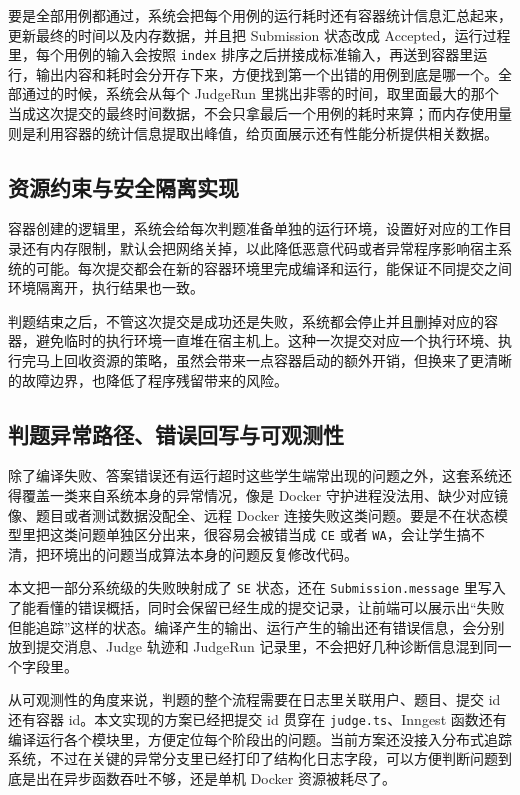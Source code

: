 要是全部用例都通过，系统会把每个用例的运行耗时还有容器统计信息汇总起来，更新最终的时间以及内存数据，并且把 Submission 状态改成 Accepted，运行过程里，每个用例的输入会按照 \texttt{index} 排序之后拼接成标准输入，再送到容器里运行，输出内容和耗时会分开存下来，方便找到第一个出错的用例到底是哪一个。全部通过的时候，系统会从每个 JudgeRun 里挑出非零的时间，取里面最大的那个当成这次提交的最终时间数据，不会只拿最后一个用例的耗时来算；而内存使用量则是利用容器的统计信息提取出峰值，给页面展示还有性能分析提供相关数据。

\subsection{资源约束与安全隔离实现}

容器创建的逻辑里，系统会给每次判题准备单独的运行环境，设置好对应的工作目录还有内存限制，默认会把网络关掉，以此降低恶意代码或者异常程序影响宿主系统的可能。每次提交都会在新的容器环境里完成编译和运行，能保证不同提交之间环境隔离开，执行结果也一致。

判题结束之后，不管这次提交是成功还是失败，系统都会停止并且删掉对应的容器，避免临时的执行环境一直堆在宿主机上。这种一次提交对应一个执行环境、执行完马上回收资源的策略，虽然会带来一点容器启动的额外开销，但换来了更清晰的故障边界，也降低了程序残留带来的风险。

\subsection{判题异常路径、错误回写与可观测性}

除了编译失败、答案错误还有运行超时这些学生端常出现的问题之外，这套系统还得覆盖一类来自系统本身的异常情况，像是 Docker 守护进程没法用、缺少对应镜像、题目或者测试数据没配全、远程 Docker 连接失败这类问题。要是不在状态模型里把这类问题单独区分出来，很容易会被错当成 \texttt{CE} 或者 \texttt{WA}，会让学生搞不清，把环境出的问题当成算法本身的问题反复修改代码。

本文把一部分系统级的失败映射成了 \texttt{SE} 状态，还在 \texttt{Submission.message} 里写入了能看懂的错误概括，同时会保留已经生成的提交记录，让前端可以展示出“失败但能追踪”这样的状态。编译产生的输出、运行产生的输出还有错误信息，会分别放到提交消息、Judge 轨迹和 JudgeRun 记录里，不会把好几种诊断信息混到同一个字段里。

从可观测性的角度来说，判题的整个流程需要在日志里关联用户、题目、提交 id 还有容器 id。本文实现的方案已经把提交 id 贯穿在 \texttt{judge.ts}、Inngest 函数还有编译运行各个模块里，方便定位每个阶段出的问题。当前方案还没接入分布式追踪系统，不过在关键的异常分支里已经打印了结构化日志字段，可以方便判断问题到底是出在异步函数吞吐不够，还是单机 Docker 资源被耗尽了\cite{kubernetesdocs}。

